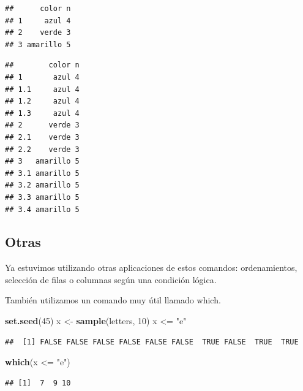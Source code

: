 \documentclass[]{article}
\newenvironment{Shaded}{\begin{snugshade}}{\end{snugshade}}
\newcommand{\KeywordTok}[1]{\textcolor[rgb]{0.13,0.29,0.53}{\textbf{{#1}}}}
\newcommand{\DecValTok}[1]{\textcolor[rgb]{0.00,0.00,0.81}{{#1}}}
\newcommand{\StringTok}[1]{\textcolor[rgb]{0.31,0.60,0.02}{{#1}}}
\newcommand{\NormalTok}[1]{{#1}}
\begin{document}
\begin{verbatim}
##      color n
## 1     azul 4
## 2    verde 3
## 3 amarillo 5
\end{verbatim}

\begin{Shaded}
\end{Shaded}

\begin{verbatim}
##        color n
## 1       azul 4
## 1.1     azul 4
## 1.2     azul 4
## 1.3     azul 4
## 2      verde 3
## 2.1    verde 3
## 2.2    verde 3
## 3   amarillo 5
## 3.1 amarillo 5
## 3.2 amarillo 5
## 3.3 amarillo 5
## 3.4 amarillo 5
\end{verbatim}

\subsection{Otras}\label{otras}

Ya estuvimos utilizando otras aplicaciones de estos comandos:
ordenamientos, selección de filas o columnas según una condición lógica.

También utilizamos un comando muy útil llamado which.

\begin{Shaded}
\begin{Highlighting}[]
\KeywordTok{set.seed}\NormalTok{(}\DecValTok{45}\NormalTok{)}
\NormalTok{x <-}\StringTok{ }\KeywordTok{sample}\NormalTok{(letters, }\DecValTok{10}\NormalTok{)}
\NormalTok{x <=}\StringTok{ "e"}
\end{Highlighting}
\end{Shaded}

\begin{verbatim}
##  [1] FALSE FALSE FALSE FALSE FALSE FALSE  TRUE FALSE  TRUE  TRUE
\end{verbatim}

\begin{Shaded}
\begin{Highlighting}[]
\KeywordTok{which}\NormalTok{(x <=}\StringTok{ "e"}\NormalTok{)}
\end{Highlighting}
\end{Shaded}

\begin{verbatim}
## [1]  7  9 10
\end{verbatim}
\end{document}
